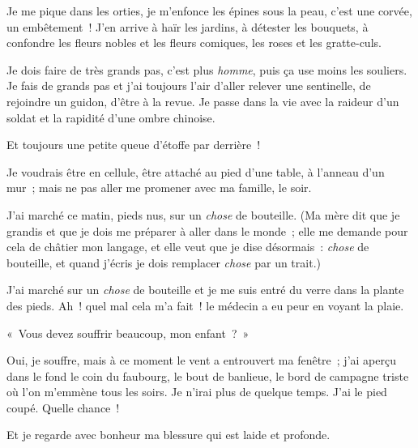 \documentclass[french,twoside]{book} %
\def\mednobreak{\ifdim\lastskip<\medskipamount
  \removelastskip\nopagebreak\medskip\fi}
\newcommand{\labelblock}[1]{\medbreak{\noindent\color{rubric}\bfseries #1}\par\mednobreak}
\begin{document}
Je me pique dans les orties, je m’enfonce les épines sous la peau, c’est une corvée, un embêtement ! J’en arrive à haïr les jardins, à détester les bouquets, à confondre les fleurs nobles et les fleurs comiques, les roses et les gratte-culs.\par
\bigbreak
\noindent Je dois faire de très grands pas, c’est plus \emph{homme}, puis ça use moins les souliers. Je fais de grands pas et j’ai toujours l’air d’aller relever une sentinelle, de rejoindre un guidon, d’être à la revue. Je passe dans la vie avec la raideur d’un soldat et la rapidité d’une ombre chinoise.\par
Et toujours une petite queue d’étoffe par derrière !\par
\bigbreak
\noindent Je voudrais être en cellule, être attaché au pied d’une table, à l’anneau d’un mur ; mais ne pas aller me promener avec ma famille, le soir.\par
\bigbreak
\noindent J’ai marché ce matin, pieds nus, sur un \emph{chose} de bouteille. (Ma mère dit que je grandis et que je dois me préparer à aller dans le monde ; elle me demande pour cela de châtier mon langage, et elle veut que je dise désormais : \emph{chose} de bouteille, et quand j’écris je dois remplacer \emph{chose} par un trait.)\par
J’ai marché sur un \emph{chose} de bouteille et je me suis entré du verre dans la plante des pieds. Ah ! quel mal cela m’a fait ! le médecin a eu peur en voyant la plaie.\par
« Vous devez souffrir beaucoup, mon enfant ? »\par
Oui, je souffre, mais à ce moment le vent a entrouvert ma fenêtre ; j’ai aperçu dans le fond le coin du faubourg, le bout de banlieue, le bord de campagne triste où l’on m’emmène tous les soirs. Je n’irai plus de quelque temps. J’ai le pied coupé. Quelle chance !\par
Et je regarde avec bonheur ma blessure qui est laide et profonde.\par

\labelblock{MON ENTRÉE DANS LE MONDE}
\end{document}
